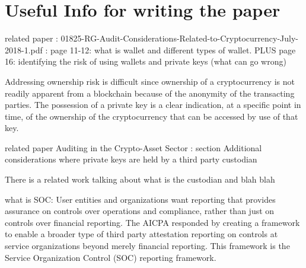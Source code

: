  


\section{Useful Info for writing the paper}
 related paper : 01825-RG-Audit-Considerations-Related-to-Cryptocurrency-July-2018-1.pdf : page 11-12: what is wallet and different types of wallet. PLUS page 16: identifying the risk of using wallets and private keys (what can go wrong)
 \par
Addressing ownership risk is difficult since ownership of a cryptocurrency
is not readily apparent from a blockchain because of the anonymity of the
transacting parties. The possession of a private key is a clear indication,
at a specific point in time, of the ownership of the cryptocurrency that
can be accessed by use of that key.

\par
related paper Auditing in the Crypto-Asset Sector : section Additional considerations where private keys are held by a third party custodian\par

There is a related work talking about what is the custodian and blah blah
\par what is SOC: User entities and organizations want reporting that provides assurance on
controls over operations and compliance, rather than just on controls over
financial reporting. The AICPA responded by creating a framework to enable a
broader type of third party attestation reporting on controls at service
organizations beyond merely financial reporting. This framework is the Service
Organization Control (SOC) reporting framework.
\par

